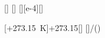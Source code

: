 [\pascal]
[\degreeCelsius]
[\deci\liter][e-4][\meter\cubed]

[\vartheta+\SI{273.15}{\kelvin}]{\thvX+273.15}[\kelvin]
[]{\pvaX*\VvaX/(\nckX*\TvaX)}
